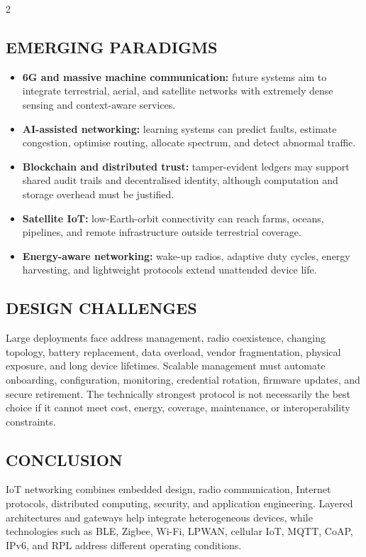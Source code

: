\begin{multicols}{2}
  \subsection*{\centering\uppercase{Emerging Paradigms}}
  \begin{itemize}\justifying
    \item \textbf{6G and massive machine communication:} future systems aim to integrate terrestrial, aerial, and satellite networks with extremely dense sensing and context-aware services.
    \item \textbf{AI-assisted networking:} learning systems can predict faults, estimate congestion, optimise routing, allocate spectrum, and detect abnormal traffic.
    \item \textbf{Blockchain and distributed trust:} tamper-evident ledgers may support shared audit trails and decentralised identity, although computation and storage overhead must be justified.
    \item \textbf{Satellite IoT:} low-Earth-orbit connectivity can reach farms, oceans, pipelines, and remote infrastructure outside terrestrial coverage.
    \item \textbf{Energy-aware networking:} wake-up radios, adaptive duty cycles, energy harvesting, and lightweight protocols extend unattended device life.
  \end{itemize}

  \subsection*{\centering\uppercase{Design Challenges}}
  Large deployments face address management, radio coexistence, changing topology, battery replacement, data overload, vendor fragmentation, physical exposure, and long device lifetimes. Scalable management must automate onboarding, configuration, monitoring, credential rotation, firmware updates, and secure retirement. The technically strongest protocol is not necessarily the best choice if it cannot meet cost, energy, coverage, maintenance, or interoperability constraints.

  \subsection*{\centering\uppercase{Conclusion}}
  IoT networking combines embedded design, radio communication, Internet protocols, distributed computing, security, and application engineering. Layered architectures and gateways help integrate heterogeneous devices, while technologies such as BLE, Zigbee, Wi-Fi, LPWAN, cellular IoT, MQTT, CoAP, IPv6, and RPL address different operating conditions.


\end{multicols}
